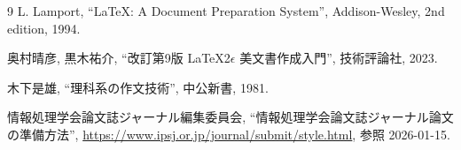 \begin{thebibliography}{9}
L. Lamport, ``\LaTeX: A Document Preparation System'', Addison-Wesley, 2nd edition, 1994.

奥村晴彦, 黒木祐介, ``改訂第9版 \LaTeX2$\epsilon$ 美文書作成入門'', 技術評論社, 2023.

木下是雄, ``理科系の作文技術'', 中公新書, 1981.

情報処理学会論文誌ジャーナル編集委員会, ``情報処理学会論文誌ジャーナル論文の準備方法'', \url{https://www.ipsj.or.jp/journal/submit/style.html}, 参照 2026-01-15.

\end{thebibliography}
